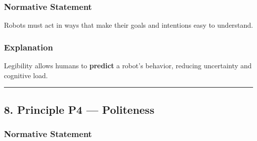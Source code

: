 \documentclass[utf8]{frontiers_suppmat} %
\newenvironment{Shaded}{\begin{shaded}}{\end{shaded}}
\begin{document}
\subsubsection{Normative Statement}\label{normative-statement-3}

Robots must act in ways that make their goals and intentions easy to
understand.

\subsubsection{Explanation}\label{explanation-3}

Legibility allows humans to \textbf{predict} a robot's behavior,
reducing uncertainty and cognitive load.

\begin{Shaded}
\begin{Highlighting}[]
\KeywordTok{:}
\KeywordTok{:}
\KeywordTok{:}
\KeywordTok{: }\CharTok{\textgreater{}}
\KeywordTok{:}
\AttributeTok{  }\KeywordTok{:}
\AttributeTok{    }\KeywordTok{{-}}\AttributeTok{ }
\AttributeTok{    }\KeywordTok{{-}}\AttributeTok{ }
\AttributeTok{  }\KeywordTok{:}
\AttributeTok{    }\KeywordTok{{-}}\AttributeTok{ }
\AttributeTok{    }\KeywordTok{{-}}\AttributeTok{ }
\end{Highlighting}
\end{Shaded}

\begin{center}\rule{0.5\linewidth}{0.5pt}\end{center}

\subsection{8. Principle P4 ---
Politeness}\label{principle-p4-politeness}

\subsubsection{Normative Statement}\label{normative-statement-4}
\end{document}
